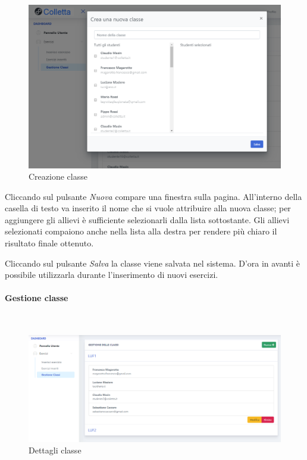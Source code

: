 \begin{figure}[H]
            	\centering
        		\includegraphics[width=17cm]{sez/img/insegnante/creanuovaclasse.PNG} 
            	\caption{Creazione classe}\label{fig:1}
        	\end{figure}            	

Cliccando sul pulsante  \textit{Nuova} compare una finestra sulla pagina. All'interno della casella di testo va inserito il nome che si vuole attribuire alla nuova classe; per aggiungere gli allievi è sufficiente selezionarli dalla lista sottostante. Gli allievi selezionati compaiono anche nella lista alla destra per rendere più chiaro il risultato finale ottenuto. 

Cliccando sul pulsante \textit{Salva} la classe viene salvata nel sistema. D'ora in avanti è possibile utilizzarla durante l'inserimento di nuovi esercizi.
 
 \paragraph{Gestione classe}\mbox{}\\
 
 \begin{figure}[H]
            	\centering
        		\includegraphics[width=17cm]{sez/img/insegnante/gestioneclasse.PNG} 
            	\caption{Dettagli classe}\label{fig:1}
        	\end{figure}
        	
